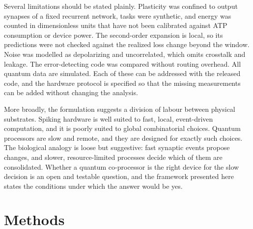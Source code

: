 Several limitations should be stated plainly. Plasticity was confined to output synapses of a fixed recurrent network, tasks were synthetic, and energy was counted in dimensionless units that have not been calibrated against ATP consumption or device power. The second-order expansion is local, so its predictions were not checked against the realized loss change beyond the window. Noise was modelled as depolarizing and uncorrelated, which omits crosstalk and leakage. The error-detecting code was compared without routing overhead. All quantum data are simulated. Each of these can be addressed with the released code, and the hardware protocol is specified so that the missing measurements can be added without changing the analysis.

More broadly, the formulation suggests a division of labour between physical substrates. Spiking hardware is well suited to fast, local, event-driven computation, and it is poorly suited to global combinatorial choices. Quantum processors are slow and remote, and they are designed for exactly such choices. The biological analogy is loose but suggestive: fast synaptic events propose changes, and slower, resource-limited processes decide which of them are consolidated\cite{frey1997}. Whether a quantum co-processor is the right device for the slow decision is an open and testable question, and the framework presented here states the conditions under which the answer would be yes.

\section*{Methods}

